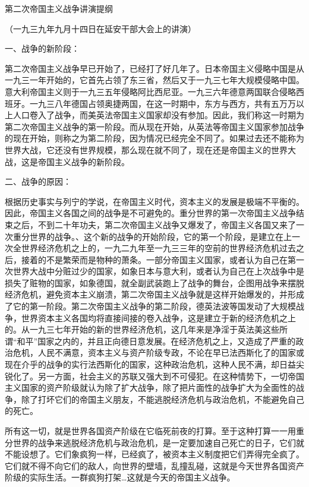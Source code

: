 第二次帝国主义战争讲演提纲

（一九三九年九月十四日在延安干部大会上的讲演）



一、战争的新阶段：

第二次帝国主义战争早已开始了，已经打了好几年了。日本帝国主义侵略中国是从一九三一年开始的，它首先占领了东三省，然后又于一九三七年大规模侵略中国。意大利帝国主义则于一九三五年侵略阿比西尼亚。一九三六年德意两国联合侵略西班牙。一九三八年德国占领奥捷两国，在这一时期中，东方与西方，共有五万万以上人口卷入了战争，而美英法帝国主义国家却没有参加。因此，我们称这一时期为第二次帝国主义战争的第一阶段。而从现在开始，从英法等帝国主义国家参加战争的现在开始，则称之为第二阶段，因为情况已经完全不同了。如果过去还不能称为世界大战，它还没有世界规模，那么现在就不同了，现在还是帝国主义的世界大战，这是帝国主义战争的新阶段。

二、战争的原因：

根据历史事实与列宁的学说，在帝国主义时代，资本主义的发展是极端不平衡的。因此，帝国主义各国之间的战争是不可避免的。重分世界的第一次帝国主义战争结束之后，不到二十年功夫，第二次帝国主义战争又爆发了，帝国主义各国又来了一次重分世界的战争。、这个新的战争的开始阶段，它的第一个阶段，是建立在上一次全世界经济危机之上的，一九二九年至一九三三年的空前的世界经济危机过去之后，接着的不是繁荣而是物种的萧条。一部分帝国主义国家，或者认为自己在第一次世界大战中分赃过少的国家，如象日本与意大利，或者认为自己在上次战争中是损失了赃物的国家，如象德国，就全副武装跑上了战争的舞台，企图用战争来摆脱经济危机，避免资本主义崩溃，第二次帝国主义战争就是这样开始爆发的，并形成了它的第一阶段。第二次帝国主义战争的第二阶段，德英法波等国发动了大规模战争，世界资本主义各国均将直接间接的卷入战争，这是建立于新的经济危机之上的。从一九三七年开始的新的世界经济危机，这几年来是净淫于英法美这些所谓“和平”国家之内的，并且正向德日意发展。在经济危机之上，又造成了严重的政治危机，人民不满意，资本主义与资产阶级专政，不论在早已法西斯化了的国家或现在介乎的战争的实行法西斯化的国家，这种政治危机，这种人民不满，却日益尖锐化了。另一方面，社会主义的苏联又强大到不可侵犯。在这种情势下，一切帝国主义国家的资产阶级就认为除了扩大战争，除了把片面性的战争扩大为全面性的战争，除了打坏它们的帝国主义朋友，不能逃脱经济危机与政治危机，不能避免自己的死亡。

所有这一切，就是世界各国资产阶级在它临死前夜的打算。至于这种打算一一用重分世界的战争来逃脱经济危机与政治危机，是一定要加速自己死亡的日子，它们就不能设想了。它们象疯狗一样，已经疯了，被资本主义制度把它们弄得完全疯了。它们就不得不向它们的敌人，向世界的壁墙，乱撞乱碰，这就是今天世界各国资产阶级的实际生活。一群疯狗打架…这就是今天的帝国主义战争。

